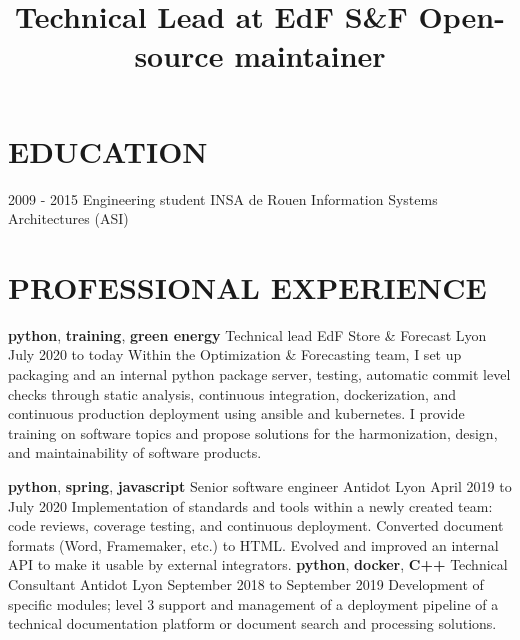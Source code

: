 \documentclass[11pt,a4paper]{moderncv}
\title{
  Technical Lead at EdF S\&F \newline{}
  Open-source maintainer
}
\begin{document}
  \maketitle
  \vspace*{-5mm}

  \section{EDUCATION}\label{sec:education}

  \cventry
    {2009 - 2015}
    {Engineering student}
    {INSA de Rouen}
    {Information Systems Architectures (ASI)}
	{}{}



  \section{PROFESSIONAL EXPERIENCE}
  \label{sec:professional-experience}

  \cventry
    {\textbf{python}, \textbf{training}, \textbf{green energy}}
    {Technical lead}
    {EdF Store \& Forecast}
    {Lyon}
    {July 2020 to today}{
      Within the Optimization \& Forecasting team, I set up packaging and an
      internal python package server, testing, automatic commit level checks
      through static analysis, continuous integration, dockerization, and
      continuous production deployment using ansible and kubernetes. I provide
      training on software topics and propose solutions for the harmonization,
      design, and maintainability of software products.
    }

  \cventry
    {\textbf{python}, \textbf{spring}, \textbf{javascript}}
    {Senior software engineer}
    {Antidot}
    {Lyon}
    {April 2019 to July 2020}{
      Implementation of standards and tools within a newly created team: code reviews,
      coverage testing, and continuous deployment. Converted document formats (Word, Framemaker, etc.) to
      HTML. Evolved and improved an internal API to make it usable by external integrators.
    }
  \cventry
    {\textbf{python}, \textbf{docker}, \textbf{C++}}
    {Technical Consultant}
    {Antidot}
    {Lyon}
    {September 2018 to September 2019}{
        Development of specific modules; level 3 support and management of a deployment pipeline
        of a technical documentation platform or document search and processing solutions.
    }
\end{document}
